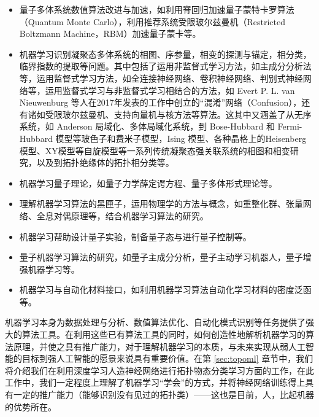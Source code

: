 \begin{itemize}

\item 量子多体系统数值算法改进与加速，如利用脊回归加速量子蒙特卡罗算法（Quantum Monte Carlo）\cite{acmc1,acmc2,acmc3,acmc4}，利用推荐系统受限玻尔兹曼机（Restricted Boltzmann Machine，RBM）加速量子蒙卡\cite{acmcwl1,acmcwl2}等。

\item 机器学习识别凝聚态多体系统的相图、序参量，相变的探测与锚定，相分类，临界指数的提取等问题\cite{ml-anderson-2014,confusion,mlphase2017-nphys,wangleipca2016,wcpca,mlphase2017-prx,jp1,jp2,jp3,jp4,zhangyiml2017,zpf2017,topoml,wanxin-2017,kernel2017,ml-mbl-2017,pca2017a,pca2017b,rbm-2017,unsup-2017,unsup-hubb-2018,discriminative2018,ml-disorder-2018}。其中包括了运用非监督式学习方法\cite{unsup-2017,unsup-hubb-2018}，如主成分分析法\cite{wangleipca2016,wcpca,pca2017a,pca2017b}等，运用监督式学习方法，如全连接神经网络\cite{zhangyiml2017,mlphase2017-prx,ml-mbl-2017}、卷积神经网络\cite{zpf2017,jp1,jp2,jp3,jp4,mlphase2017-nphys,wanxin-2017}、判别式神经网络\cite{discriminative2018}等，运用监督式学习与非监督式学习相结合的方法，如 Evert P. L. van Nieuwenburg 等人在2017年发表的工作\cite{confusion}中创立的“混淆”网络（Confusion），还有诸如受限玻尔兹曼机\cite{rbm-2017}、支持向量机与核方法\cite{kernel2017}等算法。这其中又涵盖了从无序系统\cite{ml-disorder-2018}，如 Anderson 局域化\cite{ml-anderson-2014,jp1,jp2,jp4}、多体局域化\cite{ml-mbl-2017}系统，到 Bose-Hubbard 和 Fermi-Hubbard 模型等玻色子和费米子模型\cite{confusion,rbm-2017,mlphase2017-prx,pca2017b,unsup-hubb-2018}，Ising 模型\cite{jp3,kernel2017,mlphase2017-nphys,wangleipca2016,wcpca,wanxin-2017}、各种晶格上的Heisenberg 模型、XY模型\cite{pca2017a,unsup-2017,wcpca}等自旋模型等一系列传统凝聚态强关联系统的相图和相变研究，以及到拓扑绝缘体的拓扑相分类\cite{zhangyiml2017,zpf2017,jp1,jp2}等。

\item 机器学习量子理论，如量子力学薛定谔方程\cite{dlshrodinger2017,wyd2018}、量子多体形式理论\cite{ml-manybody}等。

\item 理解机器学习算法的黑匣子\cite{mlanalysis2017lin}，运用物理学的方法与概念，如重整化群\cite{dlrg2013,maprgdl2014,rgml2018}、张量网络、全息对偶原理\cite{yyz2018}等，结合机器学习算法的研究。

\item 机器学习帮助设计量子实验\cite{activelearn-exprdesign-2018}，制备量子态与进行量子控制\cite{rein-2018-prx}等。

\item 量子机器学习算法的研究\cite{qml2017,qai2017}，如量子主成分分析\cite{qpca2014}，量子主动学习机器人\cite{active-agent-2014}，量子增强机器学习\cite{qeml}等。

\item 机器学习与自动化材料接口，如利用机器学习算法自动化学习材料的密度泛函\cite{wcyyz}等。

\end{itemize}


机器学习本身为数据处理与分析、数值算法优化、自动化模式识别等任务提供了强大的算法工具。在利用这些已有算法工具的同时，如何创造性地解析机器学习的算法原理，并使之具有推广能力，对于理解机器学习的本质，与未来实现从弱人工智能的目标到强人工智能的愿景来说具有重要价值。在第 \ref{sec:topoml} 章节中，我们将介绍我们在利用深度学习人造神经网络进行拓扑物态分类学习方面的工作\cite{topoml}，在此工作中，我们一定程度上理解了机器学习“学会”的方式，并将神经网络训练得上具有一定的推广能力（能够识别没有见过的拓扑类）——这也是目前，人，比起机器的优势所在。


